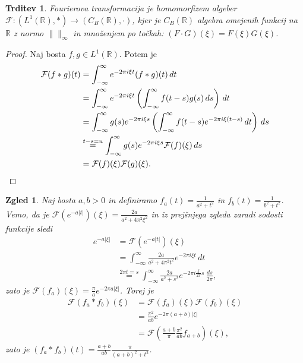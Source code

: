 \documentclass[10pt, a4paper]{article}
\newtheorem{trditev}[izr]{Trditev}
\newtheorem{zgled}{Zgled}[section]
\newenvironment{noticeC}{%
  \tcolorbox[%
  notitle,
  empty,
  enhanced,  %
  breakable,
  coltext=black, 
  fontupper=\rmfamily,
  parbox=false,
  noparskip,
  sharp corners,
  boxrule=-1pt,  %
  frame hidden,
  left=7pt,  %
  right=7pt,
  top=5pt,
  bottom=5pt,
  before skip=2.5ex plus 2pt,
  after skip=2.5ex plus 2pt,
  overlay unbroken and last={%
  },
  ]}
{\endtcolorbox}
\newenvironment{dokaz}%
  {\begin{noticeC}\begin{proof}}%
  {\end{proof}\end{noticeC}}
\newcommand{\R}{\mathbb {R}}
\newcommand{\F}{\mathcal{F}}
\begin{document}
\begin{trditev}
    Fourierova transformacija je homomorfizem algeber $\F : (L^1 (\R), *) \to (C_B (\R), \cdot)$,
    kjer je $C_B (\R)$ algebra omejenih funkcij na $\R$ z normo $\| \|_\infty$
    in množenjem po točkah: $(F \cdot G)(\xi) = F(\xi) G(\xi)$.
\end{trditev}

\begin{dokaz}
    Naj bosta $f, g \in L^1 (\R)$. Potem je
    \begin{align*}
        \F (f * g) (t) &= \int_{-\infty} ^\infty e^{-2 \pi i \xi t} (f * g) (t)\, dt\\
        &= \int_{-\infty} ^\infty e^{-2 \pi i \xi t} \left(\int_{-\infty} ^\infty f(t - s) g(s)\, ds\right)\, dt\\
        &= \int_{-\infty} ^\infty g(s) e^{-2 \pi i \xi s} \left(\int_{-\infty} ^\infty f(t - s) e^{-2 \pi i \xi (t - s)}\, dt\right)\, ds\\
        &\stackrel{t - s = u}{=} \int_{-\infty} ^\infty g(s) e^{-2 \pi i \xi s} \F (f) (\xi)\, ds\\
        &= \F (f) (\xi) \F (g) (\xi). \qedhere
    \end{align*}
\end{dokaz}

\begin{zgled}
    Naj bosta $a, b > 0$ in definiramo 
    $f_a (t) = \frac{1}{a^2 + t^2}$ in $f_b (t) = \frac{1}{b^2 + t^2}$.
    Vemo, da je $\F \left(e^{-a|t|}\right) (\xi) = \frac{2a}{a^2 + 4\pi^2 \xi^2}$
    in iz prejšnjega zgleda zaradi sodosti funkcije sledi 
    \begin{align*}
        e^{-a|\xi|} &= \F \left(e^{-a|t|}\right) (\xi)\\
        &= \int_{-\infty} ^\infty \frac{2a}{a^2 + 4 \pi^2 t^2} e^{-2\pi i \xi t}\, dt\\
        &\stackrel{2\pi t=s}{=} \int_{-\infty} ^\infty \frac{2a}{a^2 + s^2} e^{-2\pi i \frac{\xi}{2\pi} s}\, \frac{ds}{2\pi}, 
    \end{align*}
    zato je $\F (f_a) (\xi) = \frac{\pi}{a} e^{-2 \pi a |\xi|}$.
    Torej je 
    \begin{align*}
        \F (f_a * f_b) (\xi) &= \F(f_a) (\xi) \F (f_b) (\xi)\\
        &= \frac{\pi^2}{ab} e^{-2\pi (a + b) |\xi|}\\
        &= \F \left(\frac{a + b}{\pi} \frac{\pi^2}{ab}f_{a + b}\right) (\xi),
    \end{align*}
    zato je $(f_a * f_b) (t) = \frac{a + b}{ab} \frac{\pi}{(a + b)^2 + t^2}$.
\end{zgled}
\end{document}
